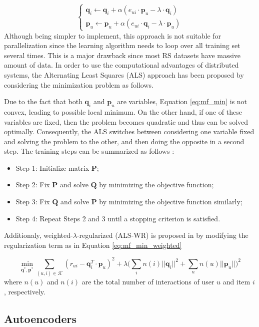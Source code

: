     \begin{equation}
        \label{eq:sgd}
            \begin{cases}
            \mathbf{q}_i \leftarrow \mathbf{q}_i + \alpha (e_{ui}\cdot \mathbf{p}_u-\lambda \cdot \mathbf{q}_i) \\
            
            \mathbf{p}_u \leftarrow \mathbf{p}_u + \alpha (e_{ui}\cdot \mathbf{q}_i-\lambda \cdot \mathbf{p}_u)
            \end{cases}
    \end{equation} Although being simpler to implement, this approach is not suitable for parallelization since the learning algorithm needs to loop over all training set several times. This is a major drawback since most RS datasets have massive amount of data. In order to use the computational advantages of distributed systems, the Alternating Least Squares (ALS) approach has been proposed by considering the minimization problem as follows.
    
    Due to the fact that both $\mathbf{q}_i$ and $\mathbf{p}_u$ are variables, Equation \ref{eq:mf_min} is not convex, leading to possible local minimum. On the other hand, if one of these variables are fixed, then the problem becomes quadratic and thus can be solved optimally. Consequently, the ALS switches between considering one variable fixed and solving the problem to the other, and then doing the opposite in a second step. The training steps can be summarized as follows \cite{2008ALSWR}:
    
    \begin{itemize}
        \item Step 1: Initialize matrix $\mathbf{P}$;
        \item Step 2: Fix $\mathbf{P}$ and solve $\mathbf{Q}$ by minimizing the objective function;
        \item Step 3: Fix $\mathbf{Q}$ and solve $\mathbf{P}$ by minimizing the objective function similarly;
        \item Step 4: Repeat Steps 2 and 3 until a stopping criterion is satisfied.
    \end{itemize}
    
    Additionaly, weighted-$\lambda$-regularized (ALS-WR) is proposed in \cite{2008ALSWR} by modifying the regularization term as in Equation \ref{eq:mf_min_weighted}
    
    \begin{equation}
        \label{eq:mf_min_weighted}
        \min_{\mathbf{q}^*, \mathbf{p}^*} \sum_{(u,i) \in \mathcal{K}} (r_{ui} - \mathbf{q}^T_i \cdot \mathbf{p}_u)^2 + \lambda \Big(\sum_i n(i)||\mathbf{q}_i||^2 + \sum_u n(u)||\mathbf{p}_u||\Big)^2
    \end{equation} where $n(u)$ and $n(i)$ are the total number of interactions of user $u$ and item $i$, respectively.

\subsection{Autoencoders}